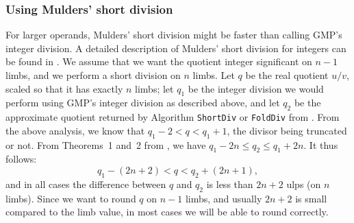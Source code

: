 \documentclass[12pt]{amsart}
\begin{document}

\subsubsection{Using Mulders' short division}

For larger operands, Mulders' short division might be faster than calling
GMP's integer division. A detailed description of Mulders' short division
for integers can be found in \cite{HaZi11}.
We assume that we want the quotient integer significant on $n-1$ limbs,
and we perform a short division on $n$ limbs.
Let $q$ be the real quotient $u/v$, scaled so that it has exactly $n$ limbs;
let $q_1$ be the integer division we would perform using GMP's integer
division as described above, and let $q_2$ be the approximate quotient
returned by Algorithm \texttt{ShortDiv} or \texttt{FoldDiv} from \cite{HaZi11}.
From the above analysis, we know that $q_1 - 2 < q < q_1 + 1$, the divisor
being truncated or not.
From Theorems~1 and~2 from \cite{HaZi11}, we have
$q_1 - 2n \leq q_2 \leq q_1 + 2n$.
It thus follows:
\[ q_1 - (2n+2) < q < q_2 + (2n+1), \]
and in all cases the difference between $q$ and $q_2$ is less than $2n+2$
ulps (on $n$ limbs).
Since we want to round $q$ on $n-1$ limbs, and usually $2n+2$ is small
compared to the limb value, in most cases we will be able to round correctly.
\end{document}
